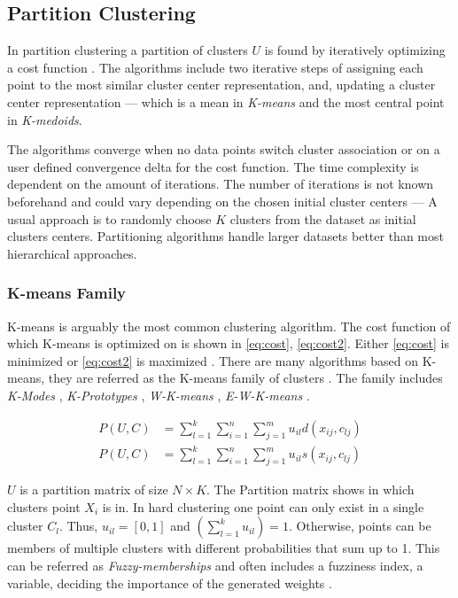 \documentclass[../report.tex]{subfiles}
\begin{document}
\subsection{Partition Clustering}
\label{sub:part}
In partition clustering a partition of clusters $U$ is found by iteratively optimizing a cost function \cite{huang2005automated, Xu2015,Jain1999}. The algorithms include two iterative steps of assigning each point to the most similar cluster center representation, and, updating a cluster center representation --- which is a mean in \textit{K-means} and the most central point in \textit{K-medoids}.

The algorithms converge when no data points switch cluster association or on a user defined convergence delta for the cost function. The time complexity is dependent on the amount of iterations. The number of iterations is not known beforehand and could vary depending on the chosen initial cluster centers --- A usual approach is to randomly choose $K$ clusters from the dataset as initial clusters centers. Partitioning algorithms handle larger datasets better than most hierarchical approaches. 




\subsubsection{K-means Family}
K-means is arguably the most common clustering algorithm. The cost function of which K-means is optimized on is shown in \ref{eq:cost}, \ref{eq:cost2}. Either \ref{eq:cost} is minimized or \ref{eq:cost2} is maximized \cite{huang2005automated}.
There are many algorithms based on K-means, they are referred as the K-means family of clusters \cite{Huang1998}. The family includes \textit{K-Modes} \cite{Ng1999}, \textit{K-Prototypes} \cite{Huang97clusteringlarge}, \textit{W-K-means} \cite{huang2005automated}, \textit{E-W-K-means} \cite{Jing2007}.

\begin{align}
  \label{eq:cost}
  P(U,C) &= \sum^k_{l=1} \sum^n_{i=1} \sum^m_{j=1} u_{il} d(x_{ij},c_{lj}) \\
  \label{eq:cost2}
  P(U,C) &= \sum^k_{l=1} \sum^n_{i=1} \sum^m_{j=1} u_{il} s(x_{ij},c_{lj})
\end{align}

$U$ is a partition matrix of size $N \times K$. The Partition matrix shows in which clusters point $X_i$ is in.  In hard clustering one point can only exist in a single cluster $C_l$. Thus, $u_{il} = [0,1]$ and $(\sum_{ l=1 }^{ k } u_{il}) = 1$. Otherwise, points can be members of multiple clusters with different probabilities that sum up to 1. This can be referred as \textit{Fuzzy-memberships} and often includes a fuzziness index, a variable, deciding the importance of the generated weights \cite{Gan2006}.
\end{document}
